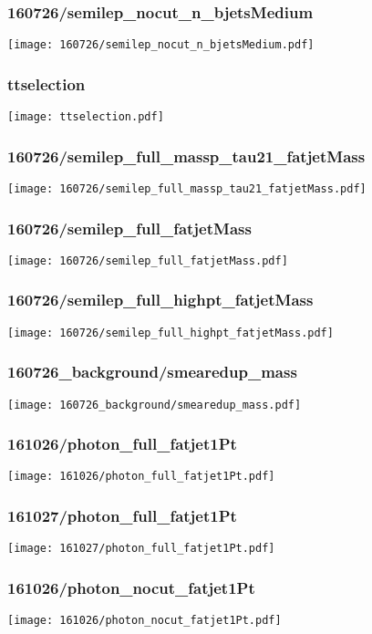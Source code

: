 \begin{frame}
   \frametitle{\small 160726/semilep\_nocut\_n\_bjetsMedium}
   \centering
   \texttt{[image: 160726/semilep\_nocut\_n\_bjetsMedium.pdf]}
\end{frame}

\begin{frame}
   \frametitle{\small ttselection}
   \centering
   \texttt{[image: ttselection.pdf]}
\end{frame}

\begin{frame}
   \frametitle{\small 160726/semilep\_full\_massp\_tau21\_fatjetMass}
   \centering
   \texttt{[image: 160726/semilep\_full\_massp\_tau21\_fatjetMass.pdf]}
\end{frame}

\begin{frame}
   \frametitle{\small 160726/semilep\_full\_fatjetMass}
   \centering
   \texttt{[image: 160726/semilep\_full\_fatjetMass.pdf]}
\end{frame}

\begin{frame}
   \frametitle{\small 160726/semilep\_full\_highpt\_fatjetMass}
   \centering
   \texttt{[image: 160726/semilep\_full\_highpt\_fatjetMass.pdf]}
\end{frame}

\begin{frame}
   \frametitle{\small 160726\_background/smearedup\_mass}
   \centering
   \texttt{[image: 160726\_background/smearedup\_mass.pdf]}
\end{frame}

\begin{frame}
   \frametitle{\small 161026/photon\_full\_fatjet1Pt}
   \centering
   \texttt{[image: 161026/photon\_full\_fatjet1Pt.pdf]}
\end{frame}

\begin{frame}
   \frametitle{\small 161027/photon\_full\_fatjet1Pt}
   \centering
   \texttt{[image: 161027/photon\_full\_fatjet1Pt.pdf]}
\end{frame}

\begin{frame}
   \frametitle{\small 161026/photon\_nocut\_fatjet1Pt}
   \centering
   \texttt{[image: 161026/photon\_nocut\_fatjet1Pt.pdf]}
\end{frame}

